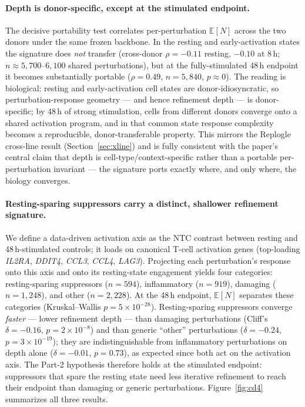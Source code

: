 \documentclass[11pt]{article}
\newcommand{\EN}{\ensuremath{\mathbb{E}[N]}}
\let\mathrho\rho
\renewcommand{\rho}{\ensuremath{\mathrho}}
\begin{document}
\paragraph{Depth is donor-specific, except at the stimulated endpoint.} The decisive portability
test correlates per-perturbation \EN{} across the two donors under the same frozen backbone. In the
resting and early-activation states the signature does \emph{not} transfer (cross-donor
\rho{}$=-0.11$ resting, $-0.10$ at 8\,h; $n\approx5{,}700$--$6{,}100$ shared perturbations), but at
the fully-stimulated 48\,h endpoint it becomes substantially portable (\rho{}$=0.49$, $n=5{,}840$,
$p\approx0$). The reading is biological: resting and early-activation cell states are
donor-idiosyncratic, so perturbation-response geometry --- and hence refinement depth --- is
donor-specific; by 48\,h of strong stimulation, cells from different donors converge onto a shared
activation program, and in that common state response complexity becomes a reproducible,
donor-transferable property. This mirrors the Replogle cross-line result (Section~\ref{sec:xline})
and is fully consistent with the paper's central claim that depth is cell-type/context-specific
rather than a portable per-perturbation invariant --- the signature ports exactly where, and only
where, the biology converges.

\paragraph{Resting-sparing suppressors carry a distinct, shallower refinement signature.} We define
a data-driven activation axis as the NTC contrast between resting and 48\,h-stimulated controls; it
loads on canonical T-cell activation genes (top-loading \textit{IL2RA}, \textit{DDIT4},
\textit{CCL3}, \textit{CCL4}, \textit{LAG3}). Projecting each perturbation's response onto this
axis and onto its resting-state engagement yields four categories: resting-sparing suppressors
($n=594$), inflammatory ($n=919$), damaging ($n=1{,}248$), and other ($n=2{,}228$). At the 48\,h
endpoint, \EN{} separates these categories (Kruskal--Wallis $p=5\times10^{-28}$). Resting-sparing
suppressors converge \emph{faster} --- lower refinement depth --- than damaging perturbations
(Cliff's $\delta=-0.16$, $p=2\times10^{-8}$) and than generic ``other'' perturbations
($\delta=-0.24$, $p=3\times10^{-19}$); they are indistinguishable from inflammatory perturbations on
depth alone ($\delta=-0.01$, $p=0.73$), as expected since both act on the activation axis. The
Part-2 hypothesis therefore holds at the stimulated endpoint: suppressors that spare the resting
state need less iterative refinement to reach their endpoint than damaging or generic
perturbations. Figure~\ref{fig:cd4} summarizes all three results.
\end{document}
